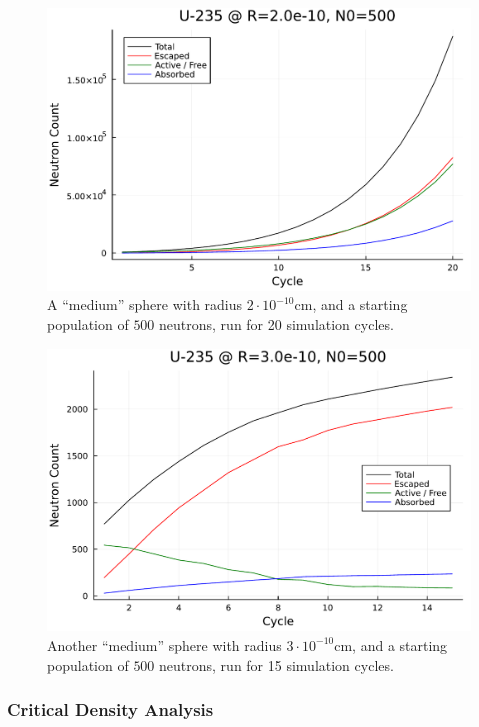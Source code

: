\begin{figure}[h!]
    \centering
    \includegraphics[scale=0.7]{imgs/neutron-count-uranium-medium-sphere-3-long.pdf}
    \caption{A ``medium'' sphere with radius $2 \cdot 10^{-10}$cm, and a starting population of $500$ neutrons, run for 20 simulation 
    cycles.}
\end{figure}

\begin{figure}[h!]
    \centering
    \includegraphics[scale=0.7]{imgs/neutron-count-uranium-medium-sphere-2.pdf}
    \caption{Another ``medium'' sphere with radius $3 \cdot 10^{-10}$cm, and a starting population of $500$ neutrons, run for 15 simulation 
    cycles.}
\end{figure}

\subsubsection{Critical Density Analysis}

